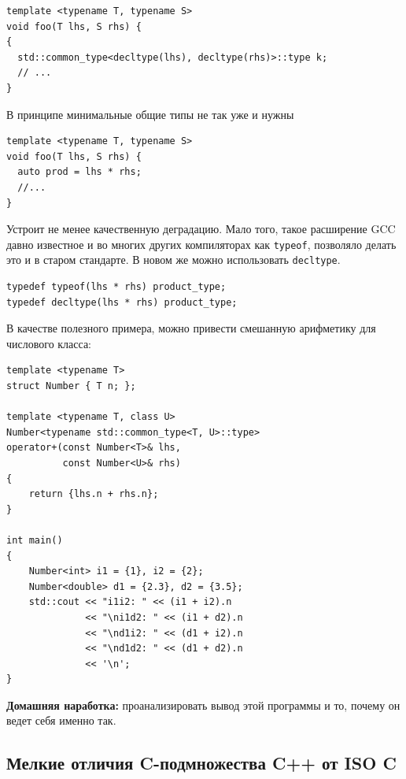 \documentclass[a4paper,12pt,oneside]{article}
\begin{document}
\begin{lstlisting}
template <typename T, typename S>
void foo(T lhs, S rhs) {
{
  std::common_type<decltype(lhs), decltype(rhs)>::type k;
  // ...
}
\end{lstlisting}

В принципе минимальные общие типы не так уже и нужны

\begin{lstlisting}
template <typename T, typename S>
void foo(T lhs, S rhs) {
  auto prod = lhs * rhs;
  //...
}
\end{lstlisting}

Устроит не менее качественную деградацию. Мало того, такое расширение GCC давно известное и во многих других компиляторах как \lstinline!typeof!, позволяло делать это и в старом стандарте. В новом же можно использовать \lstinline!decltype!.

\begin{lstlisting}
typedef typeof(lhs * rhs) product_type;
typedef decltype(lhs * rhs) product_type;
\end{lstlisting}

В качестве полезного примера, можно привести смешанную арифметику для числового класса:

\begin{lstlisting}
template <typename T>
struct Number { T n; };
 
template <typename T, class U>
Number<typename std::common_type<T, U>::type> 
operator+(const Number<T>& lhs,
          const Number<U>& rhs) 
{
    return {lhs.n + rhs.n};
}
 
int main()
{
    Number<int> i1 = {1}, i2 = {2};
    Number<double> d1 = {2.3}, d2 = {3.5};
    std::cout << "i1i2: " << (i1 + i2).n 
              << "\ni1d2: " << (i1 + d2).n 
              << "\nd1i2: " << (d1 + i2).n 
              << "\nd1d2: " << (d1 + d2).n 
              << '\n';
}
\end{lstlisting}

\textbf{Домашняя наработка:} проанализировать вывод этой программы и то, почему он ведет себя именно так.

\subsection{Мелкие отличия C-подмножества C++ от ISO C}\label{LittleDivergences}
\end{document}
